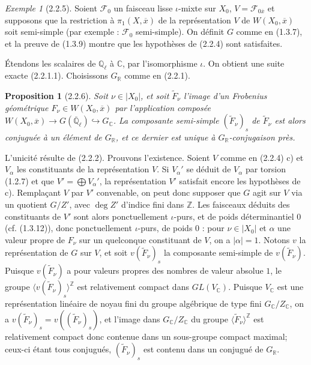 \documentclass[12pt,a4paper]{article}
\theoremstyle{plain}
\newtheorem{proposition}[theorem]{Proposition}
\theoremstyle{definition}
\theoremstyle{remark}
\newtheorem{example}[theorem]{Exemple}
\newcommand{\CC}{{\mathbb{C}}}
\newcommand{\QQ}{{\mathbb{Q}}}
\newcommand{\RR}{{\mathbb{R}}}
\newcommand{\ZZ}{{\mathbb{Z}}}
\newcommand{\QQbar}{{\overline{\QQ}}}
\begin{document}
\begin{example}[2.2.5]
Soient $\mathscr{F}_0$ un faisceau lisse $\iota$-mixte sur $X_0$, $V = \mathscr{F}_{0\overline{x}}$ et supposons que la restriction \`a $\pi_1(X, \overline{x})$ de la repr\'esentation $V$ de $W(X_0, \overline{x})$ soit semi-simple (par exemple : $\mathscr{F}_0$ semi-simple). On d\'efinit $G$ comme en (1.3.7), et la preuve de (1.3.9) montre que les hypoth\`eses de (2.2.4) sont satisfaites.

\'Etendons les scalaires de $\QQ_\ell$ \`a $\CC$, par l'isomorphisme $\iota$. On obtient une suite exacte (2.2.1.1). Choisissons $G_\RR$ comme en (2.2.1).
\end{example}

\begin{proposition}[2.2.6]
Soit $\nu \in |X_0|$, et soit $\tilde{F}_\nu$ l'image d'un Frobenius g\'eom\'etrique $F_\nu \in W(X_0, \overline{x})$ par l'application compos\'ee $W(X_0, \overline{x}) \to G(\QQbar_\ell) \hookrightarrow G_\CC$. La composante semi-simple $(\tilde{F}_\nu)_s$ de $\tilde{F}_\nu$ est alors conjugu\'ee \`a un \'el\'ement de $G_\RR$, et ce dernier est unique \`a $G_\RR$-conjugaison pr\`es.
\end{proposition}

L'unicit\'e r\'esulte de (2.2.2). Prouvons l'existence. Soient $V$ comme en (2.2.4) c) et $V_\alpha$ les constituants de la repr\'esentation $V$. Si $V_\alpha'$ se d\'eduit de $V_\alpha$ par torsion (1.2.7) et que $V' = \bigoplus V_\alpha'$, la repr\'esentation $V'$ satisfait encore les hypoth\`eses de c). Rempla\c{c}ant $V$ par $V'$ convenable, on peut donc supposer que $G$ agit sur $V$ via un quotient $G/Z'$, avec $\deg Z'$ d'indice fini dans $\ZZ$. Les faisceaux d\'eduits des constituants de $V'$ sont alors ponctuellement $\iota$-purs, et de poids d\'eterminantiel $0$ (cf. (1.3.12)), donc ponctuellement $\iota$-purs, de poids $0$ : pour $\nu \in |X_0|$ et $\alpha$ une valeur propre de $F_\nu$ sur un quelconque constituant de $V$, on a $|\alpha| = 1$. Notons $v$ la repr\'esentation de $G$ sur $V$, et soit $v(\tilde{F}_\nu)_s$ la composante semi-simple de $v(\tilde{F}_\nu)$. Puisque $v(\tilde{F}_\nu)$ a pour valeurs propres des nombres de valeur absolue $1$, le groupe $\langle v(\tilde{F}_\nu)_s \rangle^{\ZZ}$ est relativement compact dans $GL(V_\CC)$. Puisque $V_\CC$ est une repr\'esentation lin\'eaire de noyau fini du groupe alg\'ebrique de type fini $G_\CC/Z_\CC$, on a $v(\tilde{F}_\nu)_s = v((\tilde{F}_\nu)_s)$, et l'image dans $G_\CC/Z_\CC$ du groupe $\langle \tilde{F}_\nu \rangle^{\ZZ}$ est relativement compact donc contenue dans un sous-groupe compact maximal; ceux-ci \'etant tous conjugu\'es, $(\tilde{F}_\nu)_s$ est contenu dans un conjugu\'e de $G_\RR$.
\end{document}
